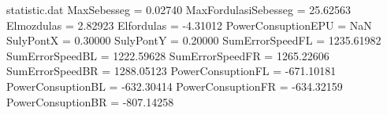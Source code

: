 \begin{filecontents*}{statistic.dat}
MaxSebesseg =    0.02740
MaxFordulasiSebesseg =   25.62563
Elmozdulas =    2.82923
Elfordulas =   -4.31012
PowerConsuptionEPU =        NaN
SulyPontX =    0.30000
SulyPontY =    0.20000
SumErrorSpeedFL = 1235.61982
SumErrorSpeedBL = 1222.59628
SumErrorSpeedFR = 1265.22606
SumErrorSpeedBR = 1288.05123
PowerConsuptionFL = -671.10181
PowerConsuptionBL = -632.30414
PowerConsuptionFR = -634.32159
PowerConsuptionBR = -807.14258
\end{filecontents*}
